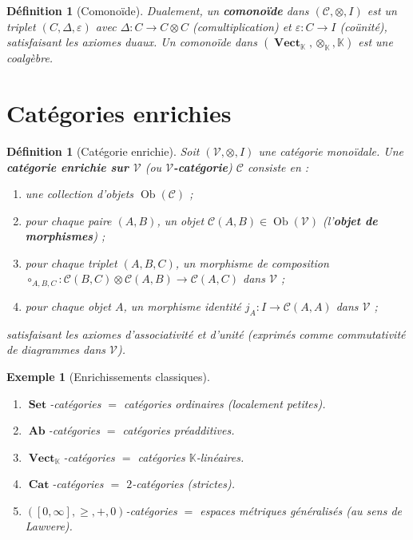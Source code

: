 \documentclass[a4paper,12pt]{book}
\DeclareMathOperator{\Ob}{Ob}
\DeclareMathOperator{\Set}{\mathbf{Set}}
\DeclareMathOperator{\Ab}{\mathbf{Ab}}
\DeclareMathOperator{\Vect}{\mathbf{Vect}}
\DeclareMathOperator{\Cat}{\mathbf{Cat}}
\newcommand{\K}{\mathbb{K}}
\newtheorem{definition}[theoreme]{Définition}
\newtheorem{exemple}[theoreme]{Exemple}
\begin{document}
\begin{definition}[Comonoïde]\label{def:comonoide}
Dualement, un \textbf{comonoïde} dans $(\mathcal{C}, \otimes, I)$
est un triplet $(C, \Delta, \varepsilon)$ avec
$\Delta \colon C \to C \otimes C$ (comultiplication) et
$\varepsilon \colon C \to I$ (coünité), satisfaisant les axiomes duaux.
Un comonoïde dans $(\Vect_\K, \otimes_\K, \K)$ est une coalgèbre.
\end{definition}

\section{Catégories enrichies}\label{sec:categories-enrichies}

\begin{definition}[Catégorie enrichie]\label{def:cat-enrichie}
Soit $(\mathcal{V}, \otimes, I)$ une catégorie monoïdale.
Une \textbf{catégorie enrichie sur $\mathcal{V}$} (ou
\textbf{$\mathcal{V}$-catégorie}) $\mathcal{C}$ consiste en :
\begin{enumerate}[label=(\roman*)]
\item une collection d'objets $\Ob(\mathcal{C})$ ;
\item pour chaque paire $(A, B)$, un objet
      $\mathcal{C}(A,B) \in \Ob(\mathcal{V})$
      (l'\textbf{objet de morphismes}) ;
\item pour chaque triplet $(A, B, C)$, un morphisme de composition
      $\circ_{A,B,C} \colon \mathcal{C}(B,C) \otimes \mathcal{C}(A,B)
      \to \mathcal{C}(A,C)$ dans $\mathcal{V}$ ;
\item pour chaque objet $A$, un morphisme identité
      $j_A \colon I \to \mathcal{C}(A,A)$ dans $\mathcal{V}$ ;
\end{enumerate}
satisfaisant les axiomes d'associativité et d'unité
(exprimés comme commutativité de diagrammes dans $\mathcal{V}$).
\end{definition}

\begin{exemple}[Enrichissements classiques]\label{ex:enrichissements}
\begin{enumerate}[label=(\roman*)]
\item $\Set$-catégories $=$ catégories ordinaires
      (localement petites).
\item $\Ab$-catégories $=$ catégories préadditives.
\item $\Vect_\K$-catégories $=$ catégories $\K$-linéaires.
\item $\Cat$-catégories $=$ $2$-catégories (strictes).
\item $([0,\infty], \geq, +, 0)$-catégories $=$ espaces métriques
      généralisés (au sens de Lawvere).
\end{enumerate}
\end{exemple}
\end{document}
